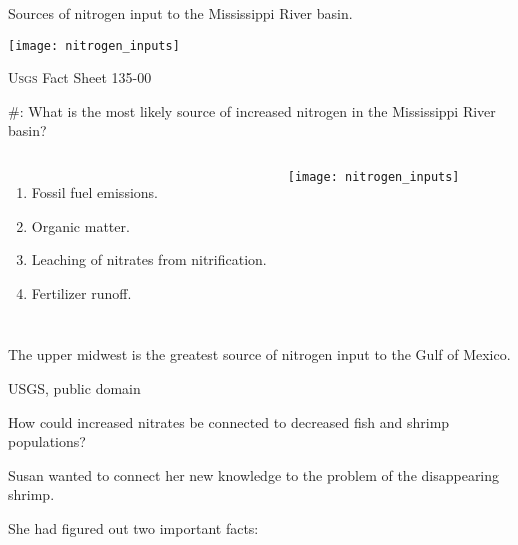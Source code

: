 \documentclass[t]{beamer}
\newcommand*{\cq}[1]{%
	\#{\lining#1}:%
}
\begin{document}
%
\begin{frame}{Sources of nitrogen input to the Mississippi River basin.}

	{\centering\texttt{[image: nitrogen\_inputs]}\par
	}
	
	\vfilll
	
	\hfill \tiny \textsc{Usgs} Fact Sheet 135-00
\end{frame}
%
\begin{frame}{\cq{5} What is the most likely source of increased nitrogen in the Mississippi River basin?}

	\vspace*{-\baselineskip}
	
	\begin{columns}[t]
	
			\begin{enumerate}
				\item Fossil fuel emissions.
				
				\item Organic matter.
				
				\item Leaching of nitrates from nitrification.
				
				\item Fertilizer runoff.
				
			\end{enumerate}
			
		
				\texttt{[image: nitrogen\_inputs]}
				
	\end{columns}
	
\end{frame}
%
{
	\begin{frame}[b]{The upper midwest is the greatest source of nitrogen input to the Gulf of Mexico.}
		
		
		\tiny \textsc{USGS}, public domain %
	\end{frame}
}
%
\begin{frame}{How could increased nitrates be connected to decreased fish and shrimp populations?}

	\hangpara Susan wanted to connect her new knowledge to the problem of the disappearing shrimp.
	
	\hangpara She had figured out two important facts:
	
	
\end{frame}
\end{document}
